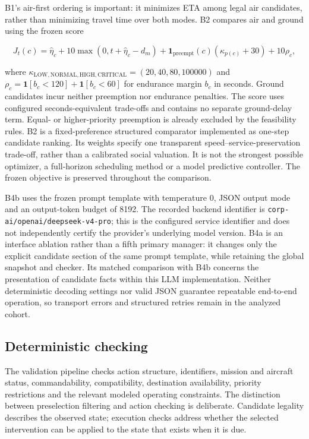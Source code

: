 \documentclass[]{interact}
\theoremstyle{plain}
\theoremstyle{definition}
\theoremstyle{remark}
\begin{document}
B1's air-first ordering is important: it minimizes ETA among legal air candidates, rather than minimizing travel time over both modes. B2 compares air and ground using the frozen score

\begin{equation*}
J_t(c)=\widehat\eta_c+10\max(0,t+\widehat\eta_c-d_m)
+\mathbf1_{\mathrm{preempt}}(c)(\kappa_{p(c)}+30)+10\rho_c, \tag{9}
\end{equation*}

where $\kappa_{\mathrm{LOW,NORMAL,HIGH,CRITICAL}}=(20,40,80,100000)$ and $\rho_c=\mathbf1[b_c<120]+\mathbf1[b_c<60]$ for endurance margin $b_c$ in seconds. Ground candidates incur neither preemption nor endurance penalties. The score uses configured seconds-equivalent trade-offs and contains no separate ground-delay term. Equal- or higher-priority preemption is already excluded by the feasibility rules. B2 is a fixed-preference structured comparator implemented as one-step candidate ranking. Its weights specify one transparent speed--service-preservation trade-off, rather than a calibrated social valuation. It is not the strongest possible optimizer, a full-horizon scheduling method or a model predictive controller. The frozen objective is preserved throughout the comparison.

B4b uses the frozen prompt template with temperature 0, JSON output mode and an output-token budget of 8192. The recorded backend identifier is \nolinkurl{corp-ai/openai/deepseek-v4-pro}; this is the configured service identifier and does not independently certify the provider's underlying model version. B4a is an interface ablation rather than a fifth primary manager: it changes only the explicit candidate section of the same prompt template, while retaining the global snapshot and checker. Its matched comparison with B4b concerns the presentation of candidate facts within this LLM implementation. Neither deterministic decoding settings nor valid JSON guarantee repeatable end-to-end operation, so transport errors and structured retries remain in the analyzed cohort.

\subsection{Deterministic checking}

The validation pipeline checks action structure, identifiers, mission and aircraft status, commandability, compatibility, destination availability, priority restrictions and the relevant modeled operating constraints. The distinction between preselection filtering and action checking is deliberate. Candidate legality describes the observed state; execution checks address whether the selected intervention can be applied to the state that exists when it is due.
\end{document}
